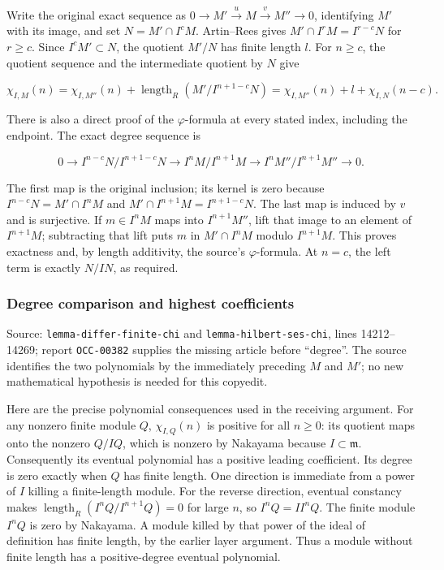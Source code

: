 Write the original exact sequence as \(0\to M'\xrightarrow{u}M\xrightarrow{v}M''\to0\), identifying \(M'\) with its image, and set \(N=M'\cap I^cM\). Artin--Rees gives \(M'\cap I^rM=I^{r-c}N\) for \(r\geq c\). Since \(I^cM'\subset N\), the quotient \(M'/N\) has finite length \(l\). For \(n\geq c\), the quotient sequence and the intermediate quotient by \(N\) give

\[
\chi_{I,M}(n)=\chi_{I,M''}(n)
 +\operatorname{length}_R(M'/I^{n+1-c}N)
=\chi_{I,M''}(n)+l+\chi_{I,N}(n-c).
\]

There is also a direct proof of the \(\varphi\)-formula at every stated index, including the endpoint. The exact degree sequence is

\[
0\longrightarrow I^{n-c}N/I^{n+1-c}N
\longrightarrow I^nM/I^{n+1}M
\longrightarrow I^nM''/I^{n+1}M''\longrightarrow0.
\]

The first map is the original inclusion; its kernel is zero because \(I^{n-c}N=M'\cap I^nM\) and \(M'\cap I^{n+1}M=I^{n+1-c}N\). The last map is induced by \(v\) and is surjective. If \(m\in I^nM\) maps into \(I^{n+1}M''\), lift that image to an element of \(I^{n+1}M\); subtracting that lift puts \(m\) in \(M'\cap I^nM\) modulo \(I^{n+1}M\). This proves exactness and, by length additivity, the source's \(\varphi\)-formula. At \(n=c\), the left term is exactly \(N/IN\), as required.

\subsubsection{Degree comparison and highest coefficients}\label{algebra-proof-003-degree-comparison-and-highest-coefficients}

Source: \texttt{lemma-differ-finite-chi} and \texttt{lemma-hilbert-ses-chi}, lines 14212--14269; report \texttt{OCC-00382} supplies the missing article before ``degree''. The source identifies the two polynomials by the immediately preceding \(M\) and \(M'\); no new mathematical hypothesis is needed for this copyedit.

Here are the precise polynomial consequences used in the receiving argument. For any nonzero finite module \(Q\), \(\chi_{I,Q}(n)\) is positive for all \(n\geq0\): its quotient maps onto the nonzero \(Q/IQ\), which is nonzero by Nakayama because \(I\subset\mathfrak m\). Consequently its eventual polynomial has a positive leading coefficient. Its degree is zero exactly when \(Q\) has finite length. One direction is immediate from a power of \(I\) killing a finite-length module. For the reverse direction, eventual constancy makes \(\operatorname{length}_R(I^nQ/I^{n+1}Q)=0\) for large \(n\), so \(I^nQ=I I^nQ\). The finite module \(I^nQ\) is zero by Nakayama. A module killed by that power of the ideal of definition has finite length, by the earlier layer argument. Thus a module without finite length has a positive-degree eventual polynomial.

